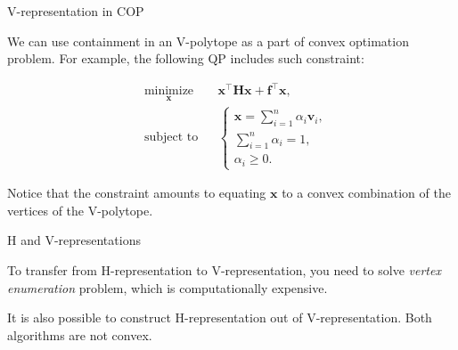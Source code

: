 \documentclass{beamer}
\begin{document}
\begin{frame}{V-representation in COP}
	\begin{flushleft}
		
		We can use containment in an V-polytope as a part of convex optimation problem. For example, the following QP includes such constraint:
		
		\begin{equation}
			\begin{aligned}
				& \underset{\mathbf{x}}{\text{minimize}}
				& & \mathbf{x}^\top \mathbf{H} \mathbf{x} + \mathbf{f}^\top\mathbf{x}, \\
				& \text{subject to}
				& & \begin{cases}
					\mathbf{x} = \sum\limits_{i=1}^{n} \alpha_i  \mathbf{v}_i, \\
					\sum\limits_{i=1}^{n} \alpha_i = 1, \\
					\alpha_i \geq 0.
				\end{cases}
			\end{aligned}
		\end{equation}
		
		Notice that the constraint amounts to equating $\mathbf{x}$ to a convex combination of the vertices of the V-polytope.
		
	\end{flushleft}
\end{frame}



\begin{frame}{H and V-representations}
\begin{flushleft}

To transfer from H-representation to V-representation, you need to solve \emph{vertex enumeration} problem, which is computationally expensive. 

\bigskip

It is also possible to construct H-representation out of V-representation.  Both algorithms are not convex.
 
\end{flushleft}
\end{frame}
\end{document}

